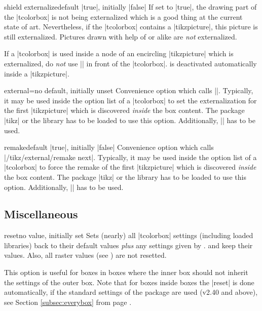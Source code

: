 \begin{docTcbKey}{shield externalize}{}{default |true|, initially |false|}
If set to |true|, the drawing part of the |tcolorbox| is not being externalized
which is a good thing at the current state of art. Nevertheless, if the
|tcolorbox| contains a |tikzpicture|, this picture is still externalized.
Pictures drawn with help of  or alike are \emph{not}
externalized.
\end{docTcbKey}

\begin{marker}
If a |tcolorbox| is used inside a node of an encircling |tikzpicture| which is externalized,
do \emph{not} use |\tikzexternaldisable| in front of the |tcolorbox|.
 is deactivated automatically inside a |tikzpicture|.
\end{marker}

\begin{docTcbKey}{external}{=}{no default, initially unset}
  Convenience option which calls ||. Typically,
  it may be used inside the option list of a |tcolorbox| to set the
  externalization  for the first |tikzpicture| which is discovered
  \emph{inside} the box content.
  The package |tikz| \cite{tantau:2013a} or the library  has to be loaded to use this option.
  Additionally, |\usetikzlibrary{external}| has to be used.
\end{docTcbKey}

\begin{docTcbKey}{remake}{}{default |true|, initially |false|}
  Convenience option which calls |/tikz/external/remake next|. Typically,
  it may be used inside the option list of a |tcolorbox| to force the remake
  of the first |tikzpicture| which is discovered \emph{inside} the box content.
  The package |tikz| \cite{tantau:2013a} or the library  has to be loaded to use this option.
  Additionally, |\usetikzlibrary{external}| has to be used.
\end{docTcbKey}


\subsection{Miscellaneous}
\begin{docTcbKey}{reset}{}{no value, initially set}
Sets (nearly) all |tcolorbox| settings (including loaded libraries) back to their default values
\emph{plus} any settings given by .
 and  keep their values.
Also, all raster values (see ) are not resetted.

This option is useful for boxes in boxes where the inner box should not inherit
the settings of the outer box.
Note that for boxes inside boxes the |reset| is done automatically, if the
standard settings of the package are used (v2.40 and above), see
Section \ref{subsec:everybox} from page \pageref{subsec:everybox}.
\end{docTcbKey}
